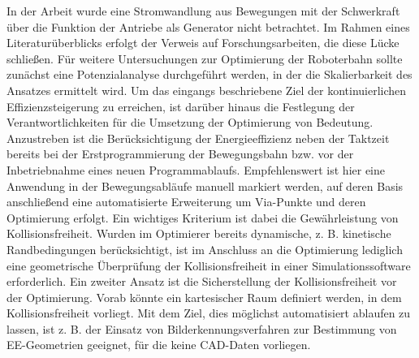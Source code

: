 In der Arbeit wurde eine Stromwandlung aus Bewegungen mit der Schwerkraft über die Funktion der Antriebe als Generator nicht betrachtet. Im Rahmen eines Literaturüberblicks erfolgt der Verweis auf Forschungsarbeiten, die diese Lücke schließen. Für weitere Untersuchungen zur Optimierung der Roboterbahn sollte zunächst eine Potenzialanalyse durchgeführt werden, in der die Skalierbarkeit des Ansatzes ermittelt wird. Um das eingangs beschriebene Ziel der kontinuierlichen Effizienzsteigerung zu erreichen, ist darüber hinaus die Festlegung der Verantwortlichkeiten für die Umsetzung der Optimierung von Bedeutung. Anzustreben ist die Berücksichtigung der Energieeffizienz neben der Taktzeit bereits bei der Erstprogrammierung der Bewegungsbahn bzw. vor der Inbetriebnahme eines neuen Programmablaufs. Empfehlenswert ist hier eine Anwendung in der Bewegungsabläufe manuell markiert werden, auf deren Basis anschließend eine automatisierte Erweiterung um Via-Punkte und deren Optimierung erfolgt. Ein wichtiges Kriterium ist dabei die Gewährleistung von Kollisionsfreiheit. Wurden im Optimierer bereits dynamische, z. B. kinetische Randbedingungen berücksichtigt, ist im Anschluss an die Optimierung lediglich eine geometrische Überprüfung der Kollisionsfreiheit in einer Simulationssoftware erforderlich. Ein zweiter Ansatz ist die Sicherstellung der Kollisionsfreiheit vor der Optimierung. Vorab könnte ein kartesischer Raum definiert werden, in dem Kollisionsfreiheit vorliegt. Mit dem Ziel, dies möglichst automatisiert ablaufen zu lassen, ist z. B. der Einsatz von Bilderkennungsverfahren zur Bestimmung von EE-Geometrien geeignet, für die keine CAD-Daten vorliegen.





